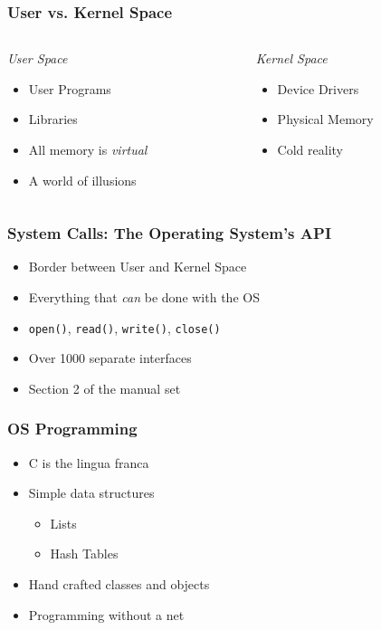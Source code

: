 \documentclass[pdftex]{beamer} %
\begin{document}
\begin{frame}[fragile]
  \frametitle{User vs. Kernel Space}
  \begin{columns}[t]
    \begin{column}{5cm}
      \emph{User Space}
      \begin{itemize}
      \item User Programs
      \item Libraries
      \item All memory is \emph{virtual}
      \item A world of illusions
      \end{itemize}
    \end{column}
    \begin{column}{5cm}
      \emph{Kernel Space}
      \begin{itemize}
      \item Device Drivers
      \item Physical Memory
      \item Cold reality
      \end{itemize}
    \end{column}
  \end{columns}
\end{frame}

\begin{frame}[fragile]
  \frametitle{System Calls: The Operating System's API}
  \begin{itemize}
  \item Border between User and Kernel Space
  \item Everything that \emph{can} be done with the OS
  \item \verb|open()|, \verb|read()|, \verb|write()|, \verb|close()|
  \item Over 1000 separate interfaces
  \item Section 2 of the manual set
  \end{itemize}
\end{frame}

\begin{frame}
  \frametitle{OS Programming}
  \begin{itemize}
  \item C is the lingua franca
  \item Simple data structures
    \begin{itemize}
    \item Lists
    \item Hash Tables
    \end{itemize}
  \item Hand crafted classes and objects
  \item Programming without a net
  \end{itemize}
\end{frame}
\end{document}
